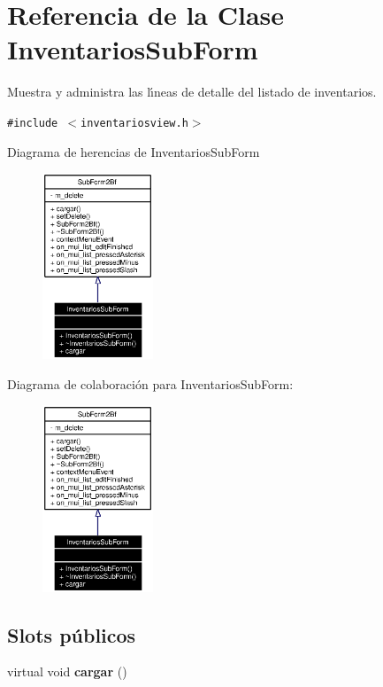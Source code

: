 \section{Referencia de la Clase Inventarios\-Sub\-Form}
\label{classInventariosSubForm}
Muestra y administra las l\'{\i}neas de detalle del listado de inventarios.  


{\tt \#include $<$inventariosview.h$>$}

Diagrama de herencias de Inventarios\-Sub\-Form\begin{figure}[H]
\begin{center}
\leavevmode
\includegraphics[width=94pt]{classInventariosSubForm__inherit__graph}
\end{center}
\end{figure}
Diagrama de colaboraci\'{o}n para Inventarios\-Sub\-Form:\begin{figure}[H]
\begin{center}
\leavevmode
\includegraphics[width=94pt]{classInventariosSubForm__coll__graph}
\end{center}
\end{figure}
\subsection*{Slots p\'{u}blicos}
\begin{CompactItemize}
\item 
virtual void {\bf cargar} ()\label{classInventariosSubForm_i0}

\end{CompactItemize}
